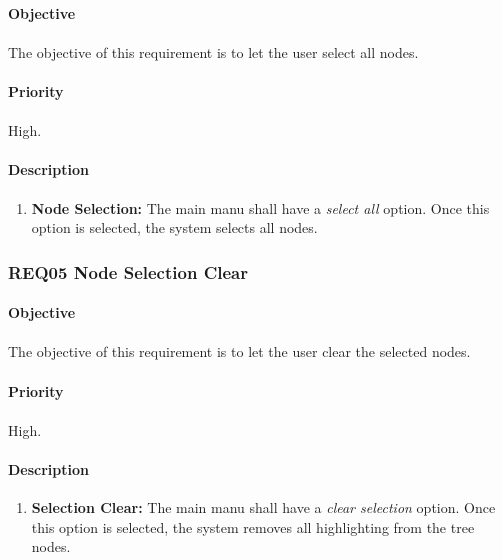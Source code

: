 \documentclass[10pt,a4paper]{article}
\begin{document}
\paragraph{Objective}
\paragraph{}
The objective of this requirement is to let the user select all nodes.
\paragraph{Priority}
\paragraph{}
High.
\paragraph{Description}
  \begin{enumerate}
    \item \textbf{Node Selection: }
	The main manu shall have a \emph{select all} option. Once this option is selected, the system selects all nodes.
    \end{enumerate}

  \subsubsection{REQ05 Node Selection Clear}
\paragraph{Objective}
\paragraph{}
The objective of this requirement is to let the user clear the selected nodes.
\paragraph{Priority}
\paragraph{}
High.
\paragraph{Description}
  \begin{enumerate}
    \item \textbf{Selection Clear: }
	The main manu shall have a \emph{clear selection} option. Once this option is selected, the system removes all highlighting from the tree nodes.
    \end{enumerate}
\end{document}
